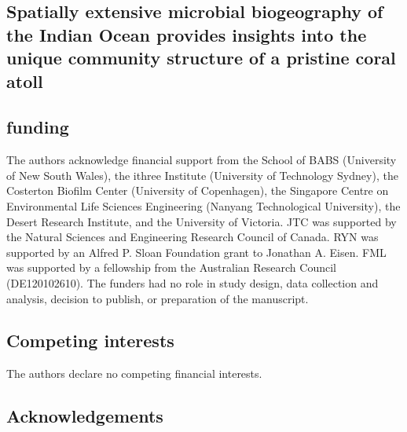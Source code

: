 \begin{refsection}

\chapter{Spatially extensive microbial biogeography of the Indian Ocean provides insights into the unique community structure of a pristine coral atoll}







\section{funding}

The authors acknowledge financial support from the School of BABS (University of New South Wales), the ithree Institute (University of Technology Sydney), the Costerton Biofilm Center (University of Copenhagen), the Singapore Centre on Environmental Life Sciences Engineering (Nanyang Technological University), the Desert Research Institute, and the University of Victoria. JTC was supported by the Natural Sciences and Engineering Research Council of Canada. RYN was supported by an Alfred P. Sloan Foundation grant to Jonathan A. Eisen. FML was supported by a fellowship from the Australian Research Council (DE120102610). The funders had no role in study design, data collection and analysis, decision to publish, or preparation of the manuscript.

\section{Competing interests}

The authors declare no competing financial interests.

\section{Acknowledgements}


\end{refsection}
